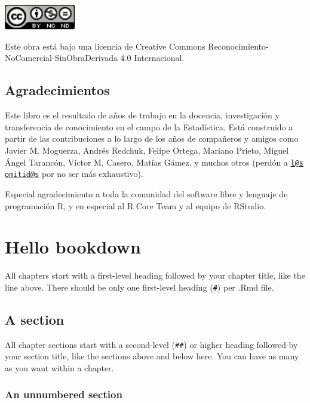 \documentclass[
]{book}
\theoremstyle{definition}
\theoremstyle{definition}
\theoremstyle{definition}
\theoremstyle{definition}
\theoremstyle{remark}
\begin{document}
\includegraphics[width=1.22in]{images/by-nc-nd}

Este obra está bajo una licencia de Creative Commons Reconocimiento-NoComercial-SinObraDerivada 4.0 Internacional.

\hypertarget{agradecimientos}{%
\section*{Agradecimientos}\label{agradecimientos}}

Este libro es el resultado de años de trabajo en la docencia, investigación
y transferencia de conocimiento en el campo de la Estadística. Está construido
a partir de las contribuciones a lo largo de los años de compañeros y amigos
como Javier M. Moguerza, Andrés Redchuk, Felipe Ortega, Mariano Prieto,
Miguel Ángel Tarancón, Víctor M. Casero, Matías Gámez, y muchos otros (perdón
a \href{mailto:l@s}{\nolinkurl{l@s}} \href{mailto:omitid@s}{\nolinkurl{omitid@s}} por no ser más exhaustivo).

Especial agradecimiento a toda la comunidad del software libre y
lenguaje de programación R, y en especial al R Core Team y al equipo
de RStudio.

\hypertarget{hello-bookdown}{%
\chapter{Hello bookdown}\label{hello-bookdown}}

All chapters start with a first-level heading followed by your chapter title, like the line above. There should be only one first-level heading (\texttt{\#}) per .Rmd file.

\hypertarget{a-section}{%
\section{A section}\label{a-section}}

All chapter sections start with a second-level (\texttt{\#\#}) or higher heading followed by your section title, like the sections above and below here. You can have as many as you want within a chapter.

\hypertarget{an-unnumbered-section}{%
\subsection*{An unnumbered section}\label{an-unnumbered-section}}
\end{document}
